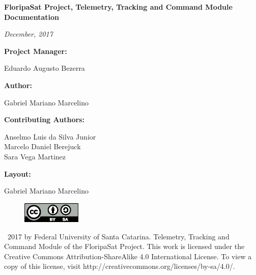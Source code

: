 \documentclass[12pt]{book}
\begin{document}
\thispagestyle{empty}

\begin{center}

\textbf{FloripaSat Project, Telemetry, Tracking and Command Module Documentation}

\textit{December, 2017}

\vspace{1cm}

\textbf{Project Manager:}

Eduardo Augusto Bezerra

\vspace{1cm}

\textbf{Author:}

Gabriel Mariano Marcelino

\vspace{1cm}

\textbf{Contributing Authors:}

Anselmo Luis da Silva Junior \\
Marcelo Daniel Berejuck \\
Sara Vega Martinez \\

\vspace{1cm}

\textbf{Layout:}

Gabriel Mariano Marcelino

\end{center}

\vspace{8cm}

\begin{figure}[!h]
	\begin{center}
		\includegraphics[width=0.25\textwidth]{figures/by-sa.eps}
	\end{center}
\end{figure}

\textcopyright\  2017 by Federal University of Santa Catarina. Telemetry, Tracking and Command Module of the FloripaSat Project. This work is licensed under the Creative Commons Attribution-ShareAlike 4.0 International License. To view a copy of this license, visit http://creativecommons.org/licenses/by-sa/4.0/.
\end{document}
